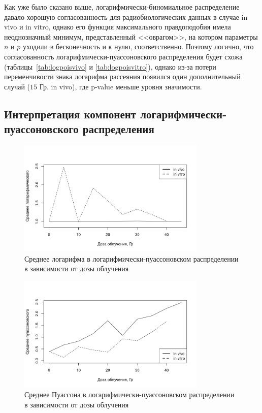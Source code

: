 \documentclass[12pt, specialist, subf, substylefile = spbu.rtx]{disser}
\begin{document}
	Как уже было сказано выше, логарифмически-биномиальное распределение давало хорошую согласованность для радиобиологических данных в случае in vivo и in vitro, однако его функция максимального правдоподобия имела неоднозначный минимум, представленный <<оврагом>>, на котором параметры $n$ и $p$ уходили в бесконечность и к нулю, соответственно. Поэтому логично, что согласованность логарифмически-пуассоновского распределения будет схожа (таблицы~\ref{tab:logpoisvivo} и \ref{tab:logpoisvitro}), однако из-за потери переменчивости знака логарифма рассеяния появился один дополнительный случай ($15$ Гр. in vivo), где p-value меньше уровня значимости.

	\subsection{Интерпретация компонент логарифмически-пуассоновского распределения}
	
	\begin{figure}[!ht]
		\centering
		\includegraphics[width = 0.8\textwidth]{logpoismeanlog}
		\caption{Среднее логарифма в логарифмически-пуассоновском распределении в зависимости от дозы облучения}
		\label{img:logpoismeanlog}
	\end{figure}
	
	\begin{figure}[!ht]
		\centering
		\includegraphics[width = 0.8\textwidth]{logpoismeanpois}
		\caption{Среднее Пуассона в логарифмически-пуассоновском распределении в зависимости от дозы облучения}
		\label{img:logpoismeanpois}
	\end{figure}
\end{document}
